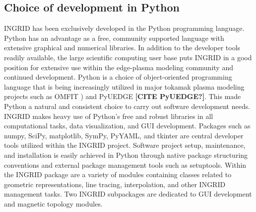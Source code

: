 \subsection{\label{sec:level2}Choice of development in Python}

INGRID has been exclusively developed in the Python programming
language. Python has an advantage as a free, community supported
language with extensive graphical and numerical libraries. In addition
to the developer tools readily available, the large scientific computing user base puts
INGRID in a good position for extensive use within the edge-plasma modeling community and continued development. Python is a choice of object-oriented programming language that is being
increasingly utilized in major tokamak plasma modeling projects such
as OMFIT \cite{Meneghini_2015, Orso_MENEGHINI2013}) and PyUEDGE
\textbf{[CITE PyUEDGE?]}. This made Python a natural and consistent choice to carry out software development needs. INGRID makes heavy use of Python's free and robust
libraries in all computational tasks, data visualization, and GUI
development. Packages such as numpy, SciPy, matplotlib, SymPy, PyYAML,
and tkinter are central developer tools utilized within the
INGRID project\cite{numpy_5725236, virtanen2019scipy, matplotlib_4160265}. Software project setup, maintenance, and installation is easily achieved in Python through native package structuring conventions and external package management tools such as setuptools.
Within the INGRID package are a variety of modules containing classes related to geometric representations, line tracing, interpolation, and other INGRID management tasks. Two INGRID subpackages are dedicated to GUI development and magnetic topology modules.